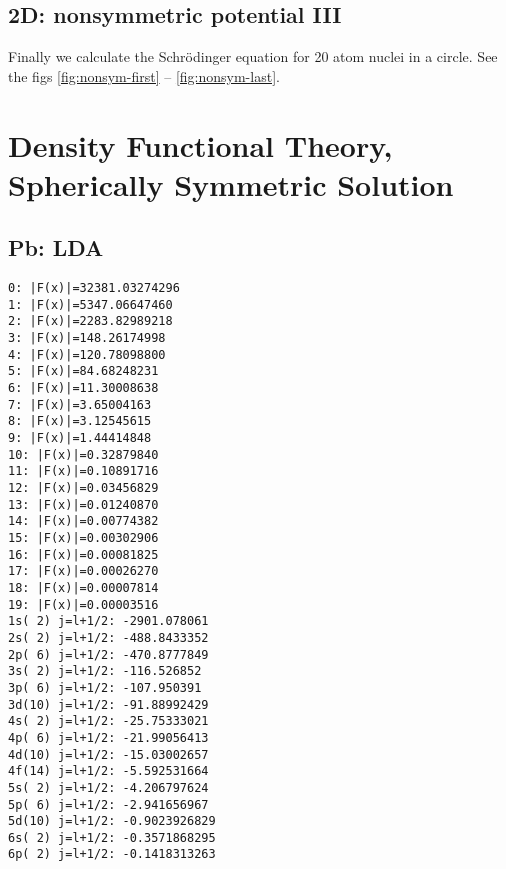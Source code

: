 
\subsection{2D: nonsymmetric potential III}

Finally we calculate the Schr\"odinger equation for 20 atom nuclei in a circle.
See the figs \ref{fig:nonsym-first} --
\ref{fig:nonsym-last}.







\section{Density Functional Theory, Spherically Symmetric Solution}

\subsection{Pb: LDA}

\begin{lstlisting}
0: |F(x)|=32381.03274296
1: |F(x)|=5347.06647460
2: |F(x)|=2283.82989218
3: |F(x)|=148.26174998
4: |F(x)|=120.78098800
5: |F(x)|=84.68248231
6: |F(x)|=11.30008638
7: |F(x)|=3.65004163
8: |F(x)|=3.12545615
9: |F(x)|=1.44414848
10: |F(x)|=0.32879840
11: |F(x)|=0.10891716
12: |F(x)|=0.03456829
13: |F(x)|=0.01240870
14: |F(x)|=0.00774382
15: |F(x)|=0.00302906
16: |F(x)|=0.00081825
17: |F(x)|=0.00026270
18: |F(x)|=0.00007814
19: |F(x)|=0.00003516
1s( 2) j=l+1/2: -2901.078061
2s( 2) j=l+1/2: -488.8433352
2p( 6) j=l+1/2: -470.8777849
3s( 2) j=l+1/2: -116.526852
3p( 6) j=l+1/2: -107.950391
3d(10) j=l+1/2: -91.88992429
4s( 2) j=l+1/2: -25.75333021
4p( 6) j=l+1/2: -21.99056413
4d(10) j=l+1/2: -15.03002657
4f(14) j=l+1/2: -5.592531664
5s( 2) j=l+1/2: -4.206797624
5p( 6) j=l+1/2: -2.941656967
5d(10) j=l+1/2: -0.9023926829
6s( 2) j=l+1/2: -0.3571868295
6p( 2) j=l+1/2: -0.1418313263
\end{lstlisting}

